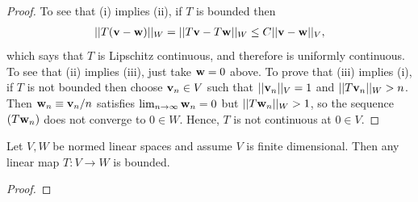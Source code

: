 \documentclass[12pt,letterpaper,reqno]{article}
\numberwithin{equation}{section}
\newcommand{\bv}{{\bf v}}
\newcommand{\bw}{{\bf w}}
\newcommand{\fixme}[1]{{\color{orange}{[#1]}}}
\begin{document}
{\begin{proof}
	To see that (i) implies (ii), if $T$ is bounded then
	\begin{align*}
		||T(\bv-\bw)||_W=||T\bv-T\bw||_W \leq C||\bv-\bw||_V,
	\end{align*}
	which says that $T$ is Lipschitz continuous, and therefore is uniformly continuous. To see that (ii) implies (iii), just take $\bw=0$ above. To prove that (iii) implies (i), if $T$ is not bounded then choose $\bv_n \in V$ such that $||\bv_n||_V=1$ and $||T\bv_n||_W>n$. Then $\bw_n\equiv \bv_n/n$ satisfies $\lim_{n \to \infty}\bw_n=0$ but $||T\bw_n||_W>1$, so the sequence $(T\bw_n)$ does not converge to $0 \in W$. Hence, $T$ is not continuous at $0 \in V$.
\end{proof}

\begin{thm}\label{thm:every_linear_map_on_a_fd_nls_is_bdd}
Let $V,W$ be normed linear spaces and assume $V$ is finite dimensional. Then any linear map $T:V \to W$ is bounded.	
\end{thm}

\begin{proof}
	\fixme{Finish.}
\end{proof}

}
\end{document}

